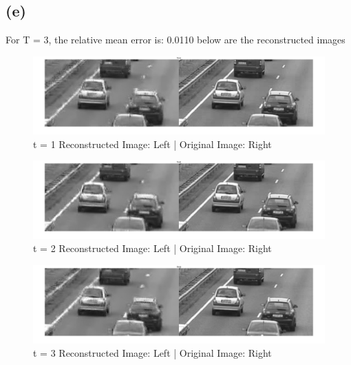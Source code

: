 \documentclass{article}
\begin{document}
\subsection{(e)}
For T = 3, the relative mean error is: 0.0110 below are the reconstructed images
\begin{figure}[!htb]
\centering
\includegraphics[width=1\textwidth]{t3/t1.jpg}
\caption{t = 1 Reconstructed Image: Left | Original Image: Right}
\end{figure}
\begin{figure}[!htb]
\centering
\includegraphics[width=1\textwidth]{t3/t2.jpg}
\caption{t = 2 Reconstructed Image: Left | Original Image: Right}
\end{figure}
\begin{figure}[!htb]
\centering
\includegraphics[width=1\textwidth]{t3/t3.jpg}
\caption{t = 3  Reconstructed Image: Left | Original Image: Right}
\end{figure}


\newpage
\end{document}
